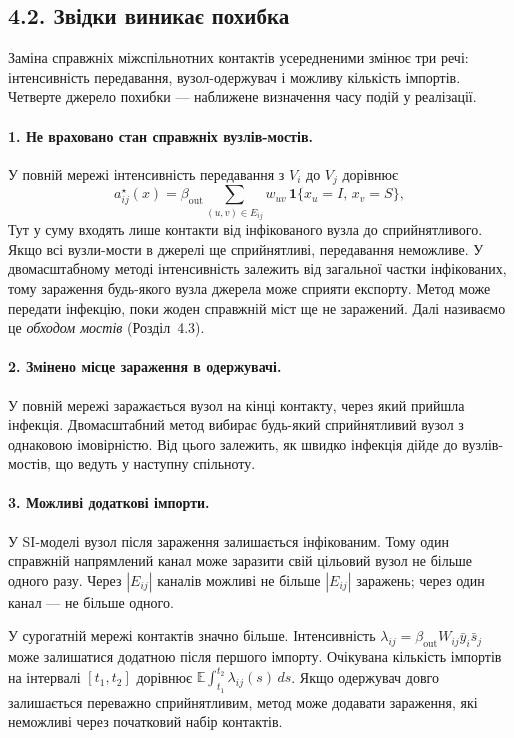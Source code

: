 \documentclass[11pt,a4paper]{article}
\newcommand{\ibar}{\bar{y}}
\newcommand{\sbar}{\bar{s}}
\newcommand{\ind}{\mathbf{1}}
\begin{document}
\subsection*{4.2. Звідки виникає похибка}

Заміна справжніх міжспільнотних контактів усередненими змінює три речі: інтенсивність передавання, вузол-одержувач і можливу кількість імпортів. Четверте джерело похибки --- наближене визначення часу подій у реалізації.
\paragraph{1. Не враховано стан справжніх вузлів-мостів.}
У повній мережі інтенсивність передавання з $V_i$ до $V_j$ дорівнює
\begin{equation*}a^\star_{ij}(x)=\beta_{\mathrm{out}}\sum_{(u,v)\in E_{ij}}w_{uv}\,\ind\{x_u=I,\,x_v=S\},\tag{7}
\end{equation*}
Тут у суму входять лише контакти від інфікованого вузла до сприйнятливого. Якщо всі вузли-мости в джерелі ще сприйнятливі, передавання неможливе. У двомасштабному методі інтенсивність залежить від загальної частки інфікованих, тому зараження будь-якого вузла джерела може сприяти експорту. Метод може передати інфекцію, поки жоден справжній міст ще не заражений. Далі називаємо це \emph{обходом мостів} (Розділ~4.3).
\paragraph{2. Змінено місце зараження в одержувачі.}
У повній мережі заражається вузол на кінці контакту, через який прийшла інфекція. Двомасштабний метод вибирає будь-який сприйнятливий вузол з однаковою імовірністю. Від цього залежить, як швидко інфекція дійде до вузлів-мостів, що ведуть у наступну спільноту.
\paragraph{3. Можливі додаткові імпорти.}
У SI-моделі вузол після зараження залишається інфікованим. Тому один справжній напрямлений канал може заразити свій цільовий вузол не більше одного разу. Через $|E_{ij}|$ каналів можливі не більше $|E_{ij}|$ заражень; через один канал --- не більше одного.
\par У сурогатній мережі контактів значно більше. Інтенсивність $\lambda_{ij}=\beta_{\mathrm{out}}W_{ij}\ibar_i\sbar_j$ може залишатися додатною після першого імпорту. Очікувана кількість імпортів на інтервалі $[t_1,t_2]$ дорівнює $\mathbb{E}\int_{t_1}^{t_2}\lambda_{ij}(s)\,ds$. Якщо одержувач довго залишається переважно сприйнятливим, метод може додавати зараження, які неможливі через початковий набір контактів.
\end{document}

